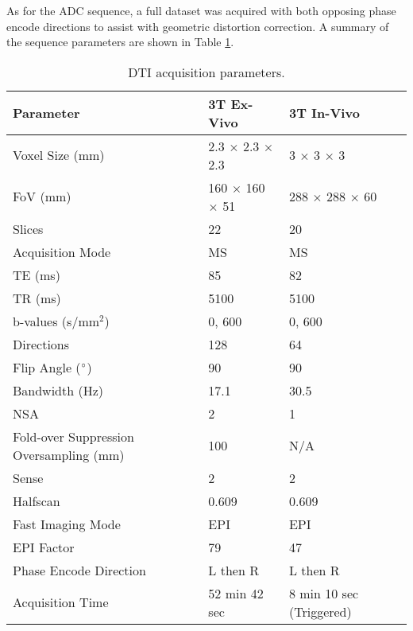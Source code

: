As for the \ac{ADC} sequence, a full dataset was acquired with both opposing phase encode directions to assist with geometric distortion correction. A summary of the sequence parameters are shown in Table \ref{tab:ex_dti_mapping}. 

\begin{table}[H]
	\centering
	\begin{tabularx}{1.0\textwidth}{X|X|X}
		\textbf{Parameter}                      & \textbf{3T Ex-Vivo} & \textbf{3T In-Vivo}      \\ \hline
		Voxel Size (mm)                         & 2.3 $\times$ 2.3 $\times$ 2.3     & 3 $\times$ 3 $\times$ 3                \\ \hline
		FoV (mm)                                & 160 $\times$ 160 $\times$ 51      & 288 $\times$ 288 $\times$ 60           \\ \hline
		Slices                                  & 22                  & 20                       \\ \hline
		Acquisition Mode                        & MS                  & MS                       \\ \hline
		TE (ms)                                 & 85                  & 82                       \\ \hline
		TR (ms)                                 & 5100                & 5100                     \\ \hline
		b-values (s/mm$^2$)                     & 0, 600              & 0, 600                   \\ \hline
		Directions                              & 128                 & 64                       \\ \hline
		Flip Angle ($\degree$)                  & 90                  & 90                       \\ \hline
		Bandwidth (Hz)                          & 17.1                & 30.5                     \\ \hline
		NSA                                     & 2                   & 1                        \\ \hline
		Fold-over Suppression Oversampling (mm) & 100                 & N/A                      \\ \hline
		Sense                                   & 2                   & 2                        \\ \hline
		Halfscan                                & 0.609               & 0.609                    \\ \hline
		Fast Imaging Mode                       & EPI                 & EPI                      \\ \hline
		EPI Factor                              & 79                  & 47                       \\ \hline
		Phase Encode Direction                  & L then R            & L then R                 \\ \hline
		Acquisition Time                        & 52 min 42 sec       & 8 min 10 sec (Triggered)
	\end{tabularx}
	\caption{\ac{DTI} acquisition parameters.}
	\label{tab:ex_dti_mapping}
\end{table}

